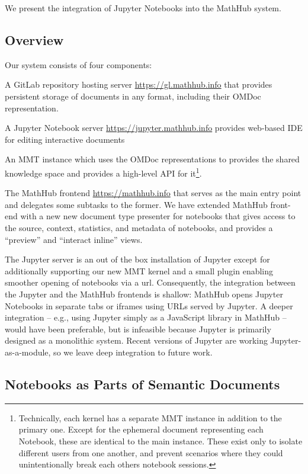 We present the integration of Jupyter Notebooks into the MathHub system.

\subsection{Overview}

Our system consists of four components:
\begin{compactitem}
\item A GitLab repository hosting server \url{https://gl.mathhub.info} that provides persistent storage of documents in any format, including their OMDoc representation.
\item A Jupyter Notebook server \url{https://jupyter.mathhub.info} provides web-based IDE for editing interactive documents
\item An MMT instance which uses the OMDoc representations to provides the shared knowledge space and provides a high-level API for it\footnote{
    Technically, each kernel has a separate MMT instance in addition to the primary one. 
    Except for the ephemeral document representing each Notebook, these are identical to the main instance. 
    These exist only to isolate different users from one another, and prevent scenarios where they could unintentionally break each others notebook sessions.  
  }.
\item The MathHub frontend \url{https://mathhub.info} that serves as the main entry point and delegates some subtasks to the former.
  We have extended MathHub front-end with a new new document type presenter for notebooks that gives access to the source, context, statistics, and metadata of notebooks, and provides a ``preview'' and ``interact inline'' views.  
\end{compactitem}

The Jupyter server is an out of the box installation of Jupyter except for additionally supporting our new MMT kernel and a small plugin enabling smoother opening of notebooks via a url. 
Consequently, the integration between the Jupyter and the MathHub frontends is shallow: MathHub opens Jupyter Notebooks in separate tabs or iframes using URLs served by Jupyter.
A deeper integration -- e.g., using Jupyter simply as a JavaScript library in MathHub -- would have been preferable, but is infeasible because Jupyter is primarily designed as a monolithic system.
Recent versions of Jupyter are working Jupyter-as-a-module, so we leave deep integration to future work.

\subsection{Notebooks as Parts of Semantic Documents}


